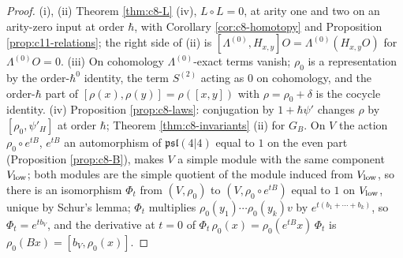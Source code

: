 \begin{proof}
(i), (ii) Theorem \ref{thm:c8-L} (iv), $L\circ L=0$, at arity one and two on an arity-zero input at order $\hbar$, with Corollary \ref{cor:c8-homotopy} and Proposition \ref{prop:c11-relations}; the right side of (ii) is $[\Lambda^{(0)},H_{x,y}]O=\Lambda^{(0)}(H_{x,y}O)$ for $\Lambda^{(0)}O=0$. (iii) On cohomology $\Lambda^{(0)}$-exact terms vanish; $\rho_0$ is a representation by the order-$\hbar^0$ identity, the term $S^{(2)}$ acting as $0$ on cohomology, and the order-$\hbar$ part of $[\rho(x),\rho(y)]=\rho([x,y])$ with $\rho=\rho_0+\delta$ is the cocycle identity. (iv) Proposition \ref{prop:c8-laws}: conjugation by $1+\hbar\psi'$ changes $\rho$ by $[\rho_0,\psi'_H]$ at order $\hbar$; Theorem \ref{thm:c8-invariants} (ii) for $G_B$. On $V$ the action $\rho_0\circ e^{tB}$, $e^{tB}$ an automorphism of $\mathfrak{psl}(4|4)$ equal to $1$ on the even part (Proposition \ref{prop:c8-B}), makes $V$ a simple module with the same component $V_{\rm low}$; both modules are the simple quotient of the module induced from $V_{\rm low}$, so there is an isomorphism $\Phi_t$ from $(V,\rho_0)$ to $(V,\rho_0\circ e^{tB})$ equal to $1$ on $V_{\rm low}$, unique by Schur's lemma; $\Phi_t$ multiplies $\rho_0(y_1)\cdots\rho_0(y_k)v$ by $e^{t(b_1+\cdots+b_k)}$, so $\Phi_t=e^{tb_V}$, and the derivative at $t=0$ of $\Phi_t\,\rho_0(x)=\rho_0(e^{tB}x)\,\Phi_t$ is $\rho_0(Bx)=[b_V,\rho_0(x)]$.
\end{proof}

